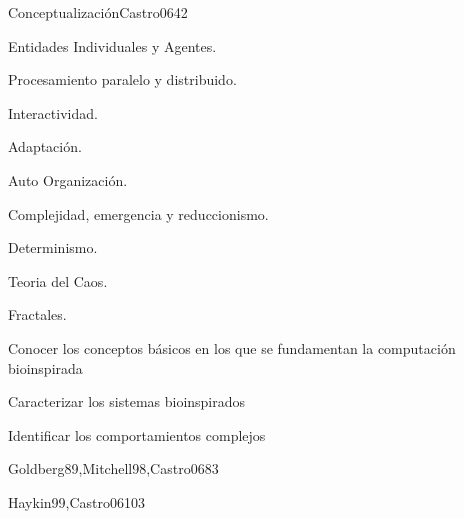\begin{syllabus}
\begin{unit}{Conceptualización}{Castro06}{4}{2}
\begin{topics}
        \item Entidades Individuales y Agentes.
        \item Procesamiento paralelo y distribuido.
        \item Interactividad.
        \item Adaptación.
        \item Auto Organización.
        \item Complejidad, emergencia y reduccionismo.
        \item Determinismo.
        \item Teoria del Caos.
        \item Fractales.
    \end{topics}

    \begin{unitgoals}
        \item Conocer los conceptos básicos en los que se fundamentan la computación bioinspirada
        \item Caracterizar los sistemas bioinspirados
        \item Identificar los comportamientos complejos
    \end{unitgoals}
\end{unit}

\begin{unit}{\ISAdvancedSearchDef}{Goldberg89,Mitchell98,Castro06}{8}{3}
     \ISAdvancedSearchAllTopics
     \ISAdvancedSearchAllObjectives
\end{unit}

\begin{unit}{\ISMachineLearningDef}{Haykin99,Castro06}{10}{3}
    \ISMachineLearningAllTopics
    \ISMachineLearningAllObjectives
\end{unit}


\end{syllabus}

